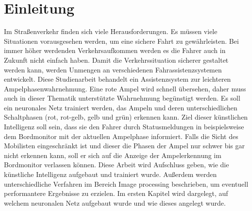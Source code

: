 \documentclass[a4paper,oneside,12pt]{report}
\begin{document}
	
	
	\tableofcontents
	\cleardoublepage
	
	
	\chapter{Einleitung}
	\begin{onehalfspace}
		Im Straßenverkehr finden sich viele Herausforderungen. Es müssen viele Situationen vorausgesehen werden, um eine sichere Fahrt zu gewährleisten. Bei immer höher werdenden Verkehrsaufkommen werden es die Fahrer auch in Zukunft nicht einfach haben. Damit die Verkehrssituation sicherer gestaltet werden kann, werden Unmengen an verschiedenen Fahrassistenzsystemen entwickelt. Diese Studienarbeit behandelt ein Assistenzsystem zur leichteren Ampelphasenwahrnehmung. Eine rote Ampel wird schnell übersehen, daher muss auch in dieser Thematik unterstützte Wahrnehmung begünstigt werden. Es soll ein neuronales Netz trainiert werden, das Ampeln und deren unterschiedlichen Schaltphasen (rot, rot-gelb, gelb und grün) erkennen kann. Ziel dieser künstlichen Intelligenz soll sein, dass sie den Fahrer durch Statusmeldungen in beispielsweise dem Bordmonitor mit der aktuellen Ampelphase informiert. Falls die Sicht des Mobilisten eingeschränkt ist und dieser die Phasen der Ampel nur schwer bis gar nicht erkennen kann, soll er sich auf die Anzeige der Ampelerkennung im Bordmonitor verlassen können. Diese Arbeit wird Aufschluss geben, wie die künstliche Intelligenz aufgebaut und trainiert wurde. Außerdem werden unterschiedliche Verfahren im Bereich Image processing beschrieben, um eventuell performantere Ergebnisse zu erzielen. Im ersten Kapitel wird dargelegt, auf welchem neuronalen Netz aufgebaut wurde und wie dieses angelegt wurde.
	\end{onehalfspace}
\end{document}
